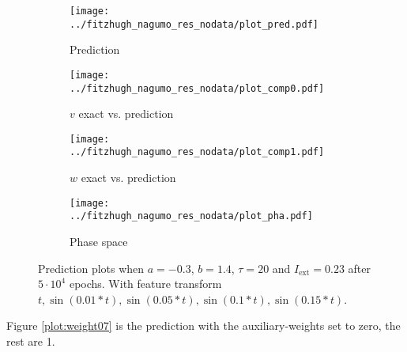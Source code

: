 \documentclass[a4paper]{article}
\begin{document}
\begin{figure}[H]
	\centering 
	\begin{subfigure}[b]{0.47\textwidth}
		\centering
		\texttt{[image: ../fitzhugh\_nagumo\_res\_nodata/plot\_pred.pdf]}
		\caption{Prediction}
		\label{fig:weight06a}
	\end{subfigure}
	\begin{subfigure}[b]{0.47\textwidth}
		\centering
		\texttt{[image: ../fitzhugh\_nagumo\_res\_nodata/plot\_comp0.pdf]}
		\caption{$v$ exact vs. prediction}
		\label{fig:weight06b}
	\end{subfigure}
	\begin{subfigure}[b]{0.47\textwidth}
		\centering
		\texttt{[image: ../fitzhugh\_nagumo\_res\_nodata/plot\_comp1.pdf]}
		\caption{$w$ exact vs. prediction}
		\label{fig:weight06c}
	\end{subfigure}
	\begin{subfigure}[b]{0.47\textwidth}
		\centering
		\texttt{[image: ../fitzhugh\_nagumo\_res\_nodata/plot\_pha.pdf]}
		\caption{Phase space}
		\label{fig:weight06d}
	\end{subfigure}
	\caption{Prediction plots when $a=-0.3$, $b=1.4$, $\tau=20$ and $ I_{\text{ext}}=0.23$ after $5\cdot10^4$ epochs. With feature transform $t, \sin(0.01 * t), \sin(0.05 * t), \sin(0.1 * t), \sin(0.15 * t)$.}
	\label{plot:weight06}
\end{figure}

Figure \ref{plot:weight07} is the prediction with the auxiliary-weights set to zero, the rest are 1.
\end{document}
